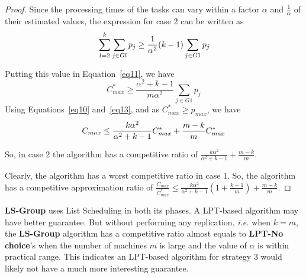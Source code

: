 \documentclass[10pt, conference, compsocconf]{IEEEtran}
\newtheorem{corollary}{Corollary}[theorem]
\begin{document}
\begin{proof}
  Since the processing times of the tasks can vary within a factor
  $\alpha$ and $\frac{1}{\alpha}$ of their estimated values, the
  expression for case 2 can be written as
  \begin{equation}{\nonumber}
    \sum_{l=2}^{k}\sum_{j \in Gl }^{}{ p_{j}} \geq \frac{1}{\alpha^2} (k-1)\sum_{j \in G1 }^{}{ p_{j}}
  \end{equation}
  
  Putting this value in Equation~\ref{eq11}, we have
  \begin{equation}\label{eq13}
    C_{max}^{*} \geq \frac{\alpha^2+k-1}{m\alpha^2}\sum_{j \in G1 }^{}{ p_{j}}
  \end{equation}
  Using Equations~\ref{eq10} and~\ref{eq13}, and as $C_{max}^{*} \geq p_{max}$, we have
  \begin{equation}{\nonumber}
    C_{max} \leq \frac{k\alpha^2}{\alpha^2+k-1}C_{max}^{*}+\frac{m-k}{m}C_{max}^{*}
  \end{equation}
  
  So, in case 2 the algorithm has a competitive ratio of
  $\frac{k\alpha^2}{\alpha^2+k-1}+\frac{m-k}{m}$.

  Clearly, the algorithm has a worst competitive ratio in case 1.  So,
  the algorithm has a competitive approximation ratio of
  $\frac{C_{max}}{C_{max}^{*}} \leq \frac{k\alpha^{2}}{\alpha^{2}+k-1}
  \left( 1+ {\frac{k-1}{m}} \right) + {\frac{m-k}{m}}$.
\end{proof}


\textbf{LS-Group} uses List Scheduling in both its phases. A LPT-based
algorithm may have better guarantee. But without performing any
replication, {\em i.e.} when $k=m$, the \textbf{LS-Group} algorithm
has a competitive ratio almost equals to \textbf{LPT-No choice}'s when
the number of machines $m$ is large and the value of $\alpha$ is
within practical range. This indicates an LPT-based algorithm for
strategy 3 would likely not have a much more interesting guarantee.
\end{document}
